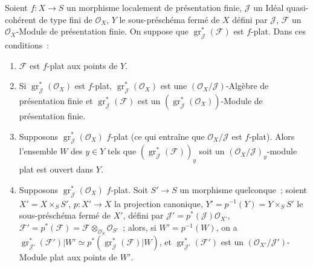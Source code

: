 \begin{proposition}[11.3.4]
\label{IV.11.3.4-fr}
Soient $f:X\to S$ un morphisme localement de présentation finie, $\mathcal J$
un Idéal quasi-cohérent de type fini de $\mathcal O_X$, $Y$ le sous-préschéma
fermé de $X$ défini par $\mathcal J$, $\mathcal F$ un $\mathcal O_X$-Module de
présentation finie. On suppose que $\operatorname{gr}_{\mathcal J}^*(\mathcal F)$
est $f$-plat. Dans ces conditions~:
\begin{enumerate}[label=\emph{(\roman*)}]
\item $\mathcal F$ est $f$-plat aux points de $Y$.
\item Si $\operatorname{gr}_{\mathcal J}^*(\mathcal O_X)$ est $f$-plat,
$\operatorname{gr}_{\mathcal J}^*(\mathcal O_X)$ est une
$(\mathcal O_X/\mathcal J)$-Algèbre de présentation finie et
$\operatorname{gr}_{\mathcal J}^*(\mathcal F)$ est un
$(\operatorname{gr}_{\mathcal J}^*(\mathcal O_X))$-Module de présentation
finie.
\item Supposons $\operatorname{gr}_{\mathcal J}^*(\mathcal O_X)$ $f$-plat
(ce qui entraîne que $\mathcal O_X/\mathcal J$ est $f$-plat). Alors l'ensemble
$W$ des $y\in Y$ tels que $(\operatorname{gr}_{\mathcal J}^*(\mathcal F))_y$
soit un $(\mathcal O_X/\mathcal J)_y$-module plat est ouvert dans $Y$.
\item Supposons $\operatorname{gr}_{\mathcal J}^*(\mathcal O_X)$ $f$-plat.
Soit $S'\to S$ un morphisme quelconque~; soient $X'=X\times_SS'$,
$p:X'\to X$ la projection canonique, $Y'=p^{-1}(Y)=Y\times_SS'$ le
sous-préschéma fermé de $X'$, défini par
$\mathcal J'=p^*(\mathcal J)\mathcal O_{X'}$, $\mathcal F'=p^*(\mathcal F)
=\mathcal F\otimes_{\mathcal O_S}\mathcal O_{S'}$~; alors, si
$W'=p^{-1}(W)$, on a
$\operatorname{gr}_{\mathcal J'}^*(\mathcal F')|W'
\simeq p^*(\operatorname{gr}_{\mathcal J}^*(\mathcal F)|W)$, et
$\operatorname{gr}_{\mathcal J'}^*(\mathcal F')$ est un
$(\mathcal O_{X'}/\mathcal J')$-Module plat aux points de $W'$.
\end{enumerate}
\end{proposition}

